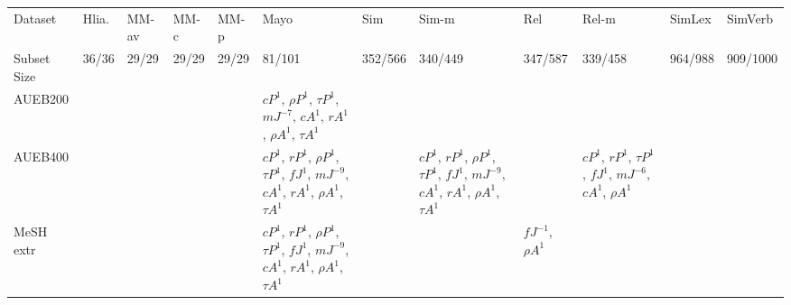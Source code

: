 \documentclass[letterpaper]{article} %
\begin{document}
\begin{sidewaystable*}
    \centering
    \small
    \begin{tabular}{l l l l l l l l l l l l}
    \toprule
         Dataset & Hlia. & MM-av & MM-c & MM-p & Mayo & Sim & Sim-m & Rel & Rel-m & SimLex & SimVerb\\ 
Subset Size & 36/36 & 29/29 & 29/29 & 29/29 & 81/101 & 352/566 & 340/449 & 347/587 & 339/458 & 964/988 & 909/1000\\
\midrule
\multirow{5}{1.5cm}{AUEB200} & \multirow{5}{1.5cm}{} & \multirow{5}{1.5cm}{} & \multirow{5}{1.5cm}{} & \multirow{5}{1.5cm}{} & \multirow{5}{1.5cm}{$cP^{1}$, $\rho P^{1}$, $\tau P^{1}$, $mJ^{-7}$, $cA^{1}$, $r A^{1}$, $\rho A^{1}$, $\tau A^{1}$} & \multirow{5}{1.5cm}{} & \multirow{5}{1.5cm}{} & \multirow{5}{1.5cm}{} & \multirow{5}{1.5cm}{} & \multirow{5}{1.5cm}{} & \multirow{5}{1.5cm}{} \\ \\ \\ \\ \\
\midrule
\multirow{6}{1.5cm}{AUEB400} & \multirow{6}{1.5cm}{} & \multirow{6}{1.5cm}{} & \multirow{6}{1.5cm}{} & \multirow{6}{1.5cm}{} & \multirow{6}{1.5cm}{$cP^{1}$, $r P^{1}$, $\rho P^{1}$, $\tau P^{1}$, $fJ^{1}$, $mJ^{-9}$, $cA^{1}$, $r A^{1}$, $\rho A^{1}$, $\tau A^{1}$} & \multirow{6}{1.5cm}{} & \multirow{6}{1.5cm}{$cP^{1}$, $r P^{1}$, $\rho P^{1}$, $\tau P^{1}$, $fJ^{1}$, $mJ^{-9}$, $cA^{1}$, $r A^{1}$, $\rho A^{1}$, $\tau A^{1}$} & \multirow{6}{1.5cm}{} & \multirow{6}{1.5cm}{$cP^{1}$, $r P^{1}$, $\tau P^{1}$, $fJ^{1}$, $mJ^{-6}$, $cA^{1}$, $\rho A^{1}$} & \multirow{6}{1.5cm}{} & \multirow{6}{1.5cm}{} \\ \\ \\ \\ \\ \\
\midrule
\multirow{6}{1.5cm}{MeSH extr} & \multirow{6}{1.5cm}{} & \multirow{6}{1.5cm}{} & \multirow{6}{1.5cm}{} & \multirow{6}{1.5cm}{} & \multirow{6}{1.5cm}{$cP^{1}$, $r P^{1}$, $\rho P^{1}$, $\tau P^{1}$, $fJ^{1}$, $mJ^{-9}$, $cA^{1}$, $r A^{1}$, $\rho A^{1}$, $\tau A^{1}$} & \multirow{6}{1.5cm}{} & \multirow{6}{1.5cm}{} & \multirow{6}{1.5cm}{$fJ^{-1}$, $\rho A^{1}$} & \multirow{6}{1.5cm}{} & \multirow{6}{1.5cm}{} & \multirow{6}{1.5cm}{} \\ \\ \\ \\ \\ \\

\end{tabular}
\end{sidewaystable*}
\end{document}
